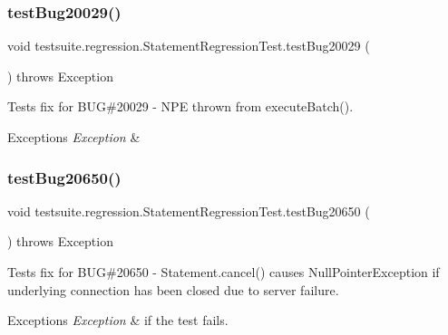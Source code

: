 \subsubsection{\texorpdfstring{test\+Bug20029()}{testBug20029()}}
{\footnotesize\ttfamily void testsuite.\+regression.\+Statement\+Regression\+Test.\+test\+Bug20029 (\begin{DoxyParamCaption}{ }\end{DoxyParamCaption}) throws Exception}

Tests fix for B\+UG\#20029 -\/ N\+PE thrown from execute\+Batch().


\begin{DoxyExceptions}{Exceptions}
{\em Exception} & \\
\hline
\end{DoxyExceptions}
\mbox{\label{classtestsuite_1_1regression_1_1_statement_regression_test_ac72c67849f782594f7036b96b6053eed}} 
\subsubsection{\texorpdfstring{test\+Bug20650()}{testBug20650()}}
{\footnotesize\ttfamily void testsuite.\+regression.\+Statement\+Regression\+Test.\+test\+Bug20650 (\begin{DoxyParamCaption}{ }\end{DoxyParamCaption}) throws Exception}

Tests fix for B\+UG\#20650 -\/ Statement.\+cancel() causes Null\+Pointer\+Exception if underlying connection has been closed due to server failure.


\begin{DoxyExceptions}{Exceptions}
{\em Exception} & if the test fails. \\
\hline
\end{DoxyExceptions}
\mbox{\label{classtestsuite_1_1regression_1_1_statement_regression_test_a0267fce90c408fe4f218251a41707fdc}} 
